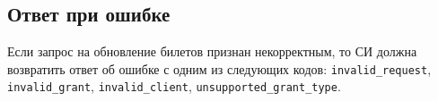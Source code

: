 \subsection{Ответ при ошибке}\label{REQRESP.Refresh.Error}

Если запрос на обновление билетов признан некорректным, то СИ должна возвратить 
ответ об ошибке с одним из следующих кодов: 
\lstinline{invalid_request},
\lstinline{invalid_grant},
\lstinline{invalid_client}, 
\lstinline{unsupported_grant_type}. 



